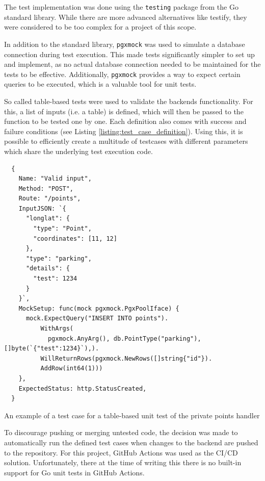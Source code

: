 The test implementation was done using the \texttt{testing} package from the Go
standard library. While there are more advanced alternatives like testify, they
were considered to be too complex for a project of this scope.

In addition to the standard library, \texttt{pgxmock} was used to simulate a
database connection during test execution. This made tests significantly simpler
to set up and implement, as no actual database connection needed to be
maintained for the tests to be effective. Additionally, \texttt{pgxmock}
provides a way to expect certain queries to be executed, which is a valuable
tool for unit tests.

So called table-based tests were used to validate the backends functionality.
For this, a list of inputs (i.e. a table) is defined, which will then be passed
to the function to be tested one by one. Each definition also comes with success
and failure conditions (see Listing \ref{listing:test_case_definition}). Using
this, it is possible to efficiently create a multitude of testcases with
different parameters which share the underlying test execution code.

\newpage{}

\begin{listing}[htbp]
  \centering{}
  \begin{minipage}{\textwidth}
  \begin{verbatim}
  {
    Name: "Valid input",
    Method: "POST",
    Route: "/points",
    InputJSON: `{
      "longlat": {
        "type": "Point",
        "coordinates": [11, 12]
      },
      "type": "parking",
      "details": {
        "test": 1234
      }
    }`,
    MockSetup: func(mock pgxmock.PgxPoolIface) {
      mock.ExpectQuery("INSERT INTO points").
          WithArgs(
            pgxmock.AnyArg(), db.PointType("parking"), []byte(`{"test":1234}`),).
          WillReturnRows(pgxmock.NewRows([]string{"id"}).
          AddRow(int64(1)))
    },
    ExpectedStatus: http.StatusCreated,
  }
  \end{verbatim}
  \end{minipage}
  \caption{An example of a test case for a table-based unit test of the private points handler}
  \label{listing:test_case_definition}
\end{listing}

To discourage pushing or merging untested code, the decision was made to
automatically run the defined test cases when changes to the backend are pushed
to the repository. For this project, GitHub Actions was used as the CI/CD
solution. Unfortunately, there at the time of writing this there is no built-in
support for Go unit tests in GitHub Actions.

